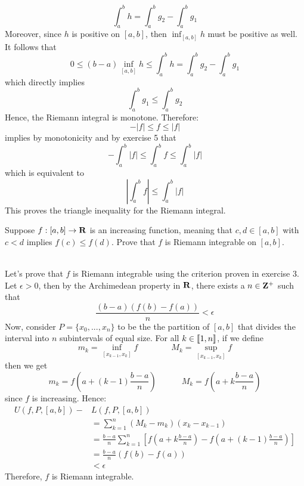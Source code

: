 \begin{solution}
    $$\int_{a}^{b}h = \int_{a}^{b}g_2 - \int_{a}^{b}g_1$$
    Moreover, since $h$ is positive on $[a,b]$, then $\inf_{[a,b]}h$ must be positive as well. It follows that
    $$0 \leq (b-a)\inf_{[a,b]}h \leq \int_{a}^{b}h = \int_{a}^{b}g_2 - \int_{a}^{b}g_1$$
    which directly implies
    $$\int_{a}^{b}g_1 \leq \int_{a}^{b}g_2$$
    Hence, the Riemann integral is monotone. Therefore:
    $$-|f| \leq f \leq |f|$$
    implies by monotonicity and by exercise 5 that
    $$-\int_{a}^{b}|f| \leq \int_{a}^{b}f \leq \int_{a}^{b}|f|$$
    which is equivalent to
    $$\left| \int_{a}^{b}f \right| \leq \int_{a}^{b}|f|$$
    This proves the triangle inequality for the Riemann integral. \\
 \end{solution}

 \begin{exercise}
    Suppose $f:[a,b] \to \mathbf{R}$ is an increasing function, meaning that $c,d \in [a,b]$ with $c < d$ implies $f(c) \leq f(d)$. Prove that $f$ is Riemann integrable on $[a,b]$.\\
 \end{exercise}

 \begin{solution}
    \\ Let's prove that $f$ is Riemann integrable using the criterion proven in exercise 3. Let $\epsilon > 0$, then by the Archimedean property in $\mathbf{R}$, there exists a $n \in \mathbf{Z}^+$ such that 
    $$\frac{(b-a)(f(b) - f(a))}{n} < \epsilon$$
    Now, consider $P = \{x_0, ..., x_n\}$ to be the the partition of $[a,b]$ that divides the interval into $n$ subintervals of equal size. For all $k \in \llbracket 1 , n \rrbracket$, if we define
    $$m_k = \inf_{[x_{k-1}, x_k]}f \qquad \qquad M_k = \sup_{[x_{k-1}, x_k]}f$$
    then we get 
    $$m_k = f\left(a + (k-1)\frac{b-a}{n}\right) \quad \qquad M_k = f\left(a + k\frac{b-a}{n}\right)$$
    since $f$ is increasing. Hence:
    \begin{align*}
        U(f, P, [a,b]) - &L(f, P, [a,b]) \\
        &= \sum_{k=1}^{n}(M_k - m_k)(x_k - x_{k-1}) \\
        &= \frac{b-a}{n}\sum_{k=1}^{n}\left[f\left(a + k\frac{b-a}{n}\right) - f\left(a + (k-1)\frac{b-a}{n}\right)\right] \\
        &= \frac{b-a}{n}(f(b) - f(a)) \\
        &< \epsilon
    \end{align*}
    Therefore, $f$ is Riemann integrable.\\
 \end{solution}

